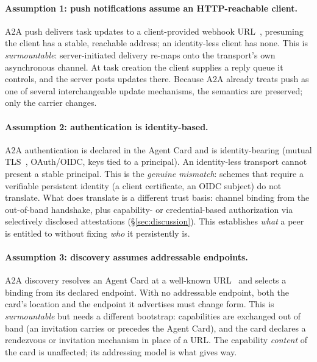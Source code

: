 \documentclass[10pt,twocolumn]{article}
\theoremstyle{definition}
\begin{document}
\paragraph{Assumption 1: push notifications assume an HTTP-reachable client.}
A2A push delivers task updates to a client-provided webhook URL~\citep[\S3.1.7]{a2a},
presuming the client has a stable, reachable address; an identity-less client has
none. This is
\emph{surmountable}: server-initiated delivery re-maps onto the transport's own
asynchronous channel. At task creation the client supplies a reply queue it
controls, and the server posts updates there. Because A2A already treats push as one
of several interchangeable update mechanisms, the semantics are preserved; only the
carrier changes.

\paragraph{Assumption 2: authentication is identity-based.}
A2A authentication is declared in the Agent Card and is identity-bearing (mutual
TLS~\citep[\S4.5.6]{a2a}, OAuth/OIDC, keys tied to a principal). An identity-less transport cannot
present a stable principal. This is the \emph{genuine mismatch}: schemes that
require a verifiable persistent identity (a client certificate, an OIDC subject) do
not translate. What does translate is a different trust basis: channel binding from
the out-of-band handshake, plus capability- or credential-based authorization via
selectively disclosed attestations (\S\ref{sec:discussion}). This establishes
\emph{what} a peer is entitled to without fixing \emph{who} it persistently is.

\paragraph{Assumption 3: discovery assumes addressable endpoints.}
A2A discovery resolves an Agent Card at a well-known URL~\citep{a2a} and selects a
binding from its declared endpoint. With no addressable endpoint, both the card's location and
the endpoint it advertises must change form. This is \emph{surmountable} but needs a
different bootstrap: capabilities are exchanged out of band (an invitation carries or
precedes the Agent Card), and the card declares a rendezvous or invitation mechanism
in place of a URL. The capability \emph{content} of the card is unaffected; its
addressing model is what gives way.
\end{document}
